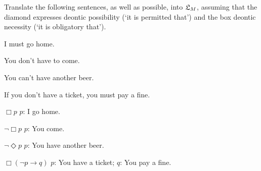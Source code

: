 \begin{exercise}
  Translate the following sentences, as well as possible, into $\mathfrak{L}_{M}$, assuming
  that the diamond expresses deontic possibility (`it is permitted that') and
  the box deontic necessity (`it is obligatory that').
  \begin{exlist}
  \item I must go home.
  \item You don't have to come.
  \item You can't have another beer.
  \item If you don't have a ticket, you must pay a fine.
  \end{exlist}
\end{exercise}
\begin{solution}
  \begin{sollist}
    \item $\Box p$ \quad  $p$: I go home.
    \item $\neg \Box p$ \quad  $p$: You come.
    \item $\neg\Diamond p$ \quad  $p$: You have another beer.
    \item $\Box(\neg p \to q)$ \quad  $p$: You have a ticket; $q$: You pay a fine.
  \end{sollist}
\end{solution}

